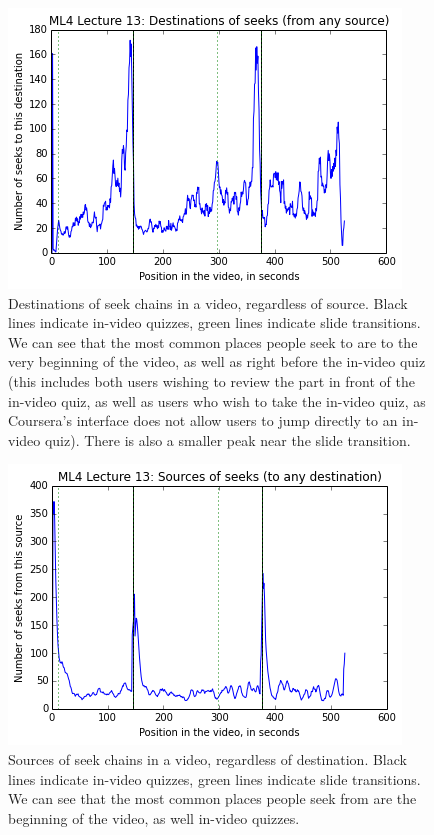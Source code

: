 \documentclass[letterpaper]{article}
\begin{document}
\begin{figure}
\includegraphics[width=1.0\columnwidth]{seekdestinations}
\caption{Destinations of seek chains in a video, regardless of source. Black lines indicate in-video quizzes, green lines indicate slide transitions. We can see that the most common places people seek to are to the very beginning of the video, as well as right before the in-video quiz (this includes both users wishing to review the part in front of the in-video quiz, as well as users who wish to take the in-video quiz, as Coursera's interface does not allow users to jump directly to an in-video quiz). There is also a smaller peak near the slide transition.}
\label{fig:seekdestinations}
\end{figure}

\begin{figure}
\includegraphics[width=1.0\columnwidth]{seeksources}
\caption{Sources of seek chains in a video, regardless of destination. Black lines indicate in-video quizzes, green lines indicate slide transitions. We can see that the most common places people seek from are the beginning of the video, as well in-video quizzes.}
\label{fig:seeksources}
\end{figure}
\end{document}
